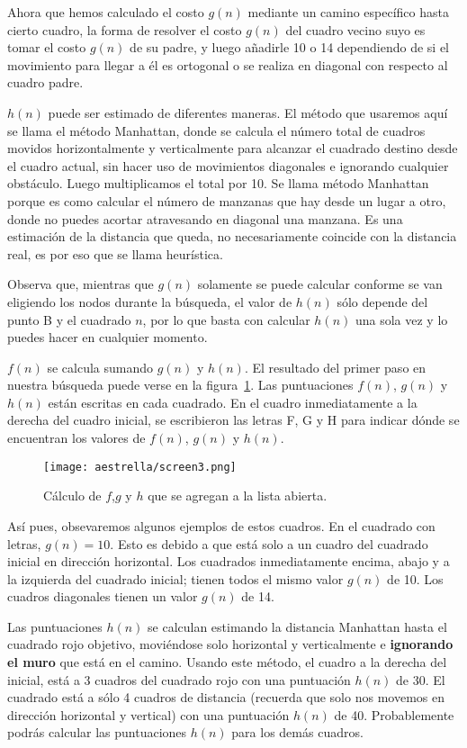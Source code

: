 Ahora que hemos calculado el costo \(g(n)\) mediante un camino específico hasta cierto cuadro, la forma de resolver el costo \(g(n)\) del cuadro vecino suyo es tomar el costo \(g(n)\) de su padre, y luego añadirle 10 o 14 dependiendo de si el movimiento para llegar a él es ortogonal o se realiza en diagonal con respecto al cuadro padre.

\(h(n)\) puede ser estimado de diferentes maneras. El método que usaremos aquí se llama el método Manhattan, donde se calcula el número total de cuadros movidos horizontalmente y verticalmente para alcanzar el cuadrado destino desde el cuadro actual, sin hacer uso de movimientos diagonales e ignorando cualquier obstáculo. Luego multiplicamos el total por 10. Se llama método Manhattan porque es como calcular el número de manzanas que hay desde un lugar a otro, donde no puedes acortar atravesando en diagonal una manzana. Es una estimación de la distancia que queda, no necesariamente coincide con la distancia real, es por eso que se llama heurística.

Observa que, mientras que \(g(n)\) solamente se puede calcular conforme se van eligiendo los nodos durante la búsqueda, el valor de \(h(n)\) sólo depende del punto B y el cuadrado \(n\), por lo que basta con calcular \(h(n)\) una sola vez y lo puedes hacer en cualquier momento.

\(f(n)\) se calcula sumando \(g(n)\) y \(h(n)\). El resultado del primer paso en nuestra búsqueda puede verse en la figura~\ref{fig:fig3P4}. Las puntuaciones \(f(n)\), \(g(n)\) y \(h(n)\) están escritas en cada cuadrado. En el cuadro inmediatamente a la derecha del cuadro inicial, se escribieron las letras F, G y H para indicar dónde se encuentran los valores de \(f(n)\), \(g(n)\) y \(h(n)\).

\begin{figure}[h!]
  \centering
  \texttt{[image: aestrella/screen3.png]}
  \caption{Cálculo de \(f\),\(g\) y \(h\) que se agregan a la lista abierta.}
  \label{fig:fig3P4}
\end{figure}

Así pues, obsevaremos algunos ejemplos de estos cuadros. En el cuadrado con letras, \(g(n)=10\). Esto es debido a que está solo a un cuadro del cuadrado inicial en dirección horizontal. Los cuadrados inmediatamente encima, abajo y a la izquierda del cuadrado inicial; tienen todos el mismo valor \(g(n)\) de 10. Los cuadros diagonales tienen un valor \(g(n)\) de 14.

Las puntuaciones \(h(n)\) se calculan estimando la distancia Manhattan hasta el cuadrado rojo objetivo, moviéndose solo horizontal y verticalmente e \textbf{ignorando el muro} que está en el camino. Usando este método, el cuadro a la derecha del inicial, está a 3 cuadros del cuadrado rojo con una puntuación \(h(n)\) de 30. El cuadrado está a sólo 4 cuadros de distancia (recuerda que solo nos movemos en dirección horizontal y vertical) con una puntuación \(h(n)\) de 40. Probablemente podrás calcular las puntuaciones \(h(n)\) para los demás cuadros.

